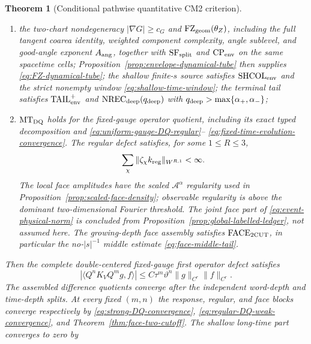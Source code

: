 \documentclass[11pt]{article}
\newtheorem{theorem}{Theorem}[section]
\begin{document}
\begin{theorem}[Conditional pathwise quantitative CM2 criterion]
\begin{enumerate}[label=\textup{(H\arabic*)}]
      \eqref{eq:three-frequency-cutoffs} satisfy
      $0<\eta_{\rm lo}<\eta_{\rm hi}$ and
      $r_{\rm obs}>2+\beta_{\rm phase}^{W}$,
      \eqref{eq:ultra-high-exponent-window}, and the complete phase exponent
      \eqref{eq:complete-phase-exponent}; longer shallow times are not estimated
      by this interface;
\item the two-chart nondegeneracy $|\nabla G|\ge c_G$ and
      $\mathrm{FZ}_{\rm geom}(\theta_Z)$, including the full tangent coarea identity,
      weighted component complexity, angle sublevel, and good-angle exponent
      $A_{\rm ang}$, together with $\mathrm{SF}_{\rm split}$ and
      $\mathrm{CP}_{\rm env}$ on the same spacetime cells;
      Proposition~\ref{prop:envelope-dynamical-tube}
      then supplies \eqref{eq:FZ-dynamical-tube}; the shallow finite-$s$
      source satisfies $\mathrm{SHCOL}_{\rm env}$ and the strict nonempty
      window \eqref{eq:shallow-time-window}; the terminal tail satisfies
      $\mathrm{TAIL}_{\rm env}^{+}$ and
      $\mathrm{NREC}_{\rm deep}(q_{\rm deep})$ with
      $q_{\rm deep}>\max\{\alpha_+,\alpha_-\}$;
\item $\mathrm{MT}_{\rm DQ}$ holds for the fixed-gauge operator quotient,
      including its exact typed decomposition and
      \eqref{eq:uniform-gauge-DQ-regular}--
      \eqref{eq:fixed-time-evolution-convergence}.  The regular defect
      satisfies, for some
      $1\le R\le3$,
      \[
       \sum_\chi\|\zeta_\chi k_{\rm reg}\|_{W^{R,1}}<\infty.
      \]
      The local face amplitudes have the scaled
      $\mathcal A^\alpha$ regularity used in
      Proposition~\ref{prop:scaled-face-density}; observable regularity is
      above the dominant two-dimensional Fourier threshold.  The joint face
      part of \eqref{eq:event-physical-norm} is concluded from
      Proposition~\ref{prop:global-labelled-ledger}, not assumed here.
      The growing-depth face assembly satisfies
      $\mathrm{FACE}_{\rm 2CUT}$, in particular the no-$|s|^{-1}$ middle
      estimate \eqref{eq:face-middle-tail}.
\end{enumerate}
Then the complete double-centered fixed-gauge first operator defect satisfies
\[
 |\langle Q^nK_VQ^mg,f\rangle|
 \le C\tau^m\vartheta^n\|g\|_{C^r}\|f\|_{C^r}.
\]
The assembled difference quotients converge after the independent word-depth
and time-depth splits.  At every fixed $(m,n)$ the response, regular, and face
blocks converge respectively by
\eqref{eq:strong-DQ-convergence},
\eqref{eq:regular-DQ-weak-convergence}, and
Theorem~\ref{thm:face-two-cutoff}.  The shallow long-time part converges to zero by

\end{theorem}
\end{document}
